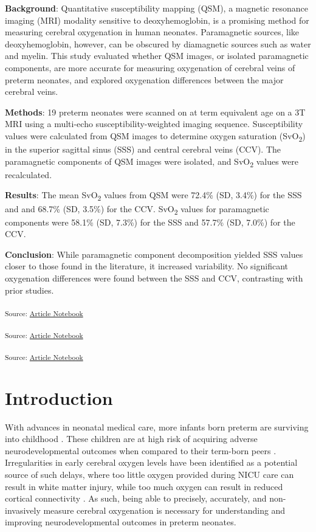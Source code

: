 \documentclass[
true
]{sn-jnl}
\begin{document}
\textbf{Background}: Quantitative susceptibility mapping (QSM), a
magnetic resonance imaging (MRI) modality sensitive to deoxyhemoglobin,
is a promising method for measuring cerebral oxygenation in human
neonates. Paramagnetic sources, like deoxyhemoglobin, however, can be
obscured by diamagnetic sources such as water and myelin. This study
evaluated whether QSM images, or isolated paramagnetic components, are
more accurate for measuring oxygenation of cerebral veins of preterm
neonates, and explored oxygenation differences between the major
cerebral veins.

\textbf{Methods}: 19 preterm neonates were scanned on at term equivalent
age on a 3T MRI using a multi-echo susceptibility-weighted imaging
sequence. Susceptibility values were calculated from QSM images to
determine oxygen saturation (SvO\textsubscript{2}) in the superior
sagittal sinus (SSS) and central cerebral veins (CCV). The paramagnetic
components of QSM images were isolated, and SvO\textsubscript{2} values
were recalculated.

\textbf{Results}: The mean SvO\textsubscript{2} values from QSM were
72.4\% (SD, 3.4\%) for the SSS and and 68.7\% (SD, 3.5\%) for the CCV.
SvO\textsubscript{2} values for paramagnetic components were 58.1\% (SD,
7.3\%) for the SSS and 57.7\% (SD, 7.0\%) for the CCV.

\textbf{Conclusion}: While paramagnetic component decomposition yielded
SSS values closer to those found in the literature, it increased
variability. No significant oxygenation differences were found between
the SSS and CCV, contrasting with prior studies.

\textsubscript{Source:
\href{https://WeberLab.github.io/Chisep_CSVO2_Manuscript/index-preview.html}{Article
Notebook}}

\textsubscript{Source:
\href{https://WeberLab.github.io/Chisep_CSVO2_Manuscript/index-preview.html}{Article
Notebook}}

\textsubscript{Source:
\href{https://WeberLab.github.io/Chisep_CSVO2_Manuscript/index-preview.html}{Article
Notebook}}

\newpage{}

\section{Introduction}\label{sec-intro}

With advances in neonatal medical care, more infants born preterm are
surviving into childhood \citep{mckenzieScaffoldingParentingHealth2022}.
These children are at high risk of acquiring adverse neurodevelopmental
outcomes when compared to their term-born peers
\citep{twilhaarCognitiveOutcomesChildren2018}. Irregularities in early
cerebral oxygen levels have been identified as a potential source of
such delays, where too little oxygen provided during NICU care can
result in white matter injury, while too much oxygen can result in
reduced cortical connectivity \citep{rantakariEarlyOxygenLevels2021}. As
such, being able to precisely, accurately, and non-invasively measure
cerebral oxygenation is necessary for understanding and improving
neurodevelopmental outcomes in preterm neonates.
\end{document}

